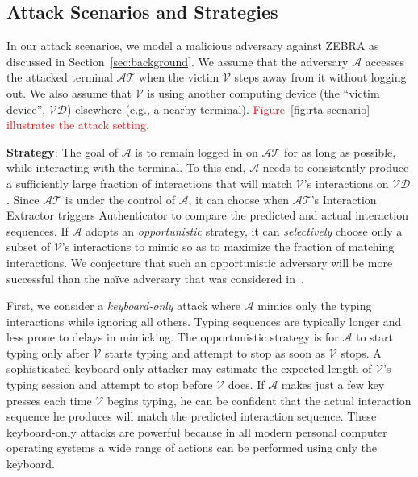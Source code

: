 \documentclass[conference]{IEEEtran}
\newcommand{\zebra}{ZEBRA\xspace}
\newcommand{\KBactivity}{keyboard-only\xspace}
\newcommand{\attacker}{$\mathcal{A}$\xspace}
\newcommand{\victim}{$\mathcal{V}$\xspace}
\newcommand{\attackedterminal}{$\mathcal{AT}$\xspace}
\newcommand{\victimdevice}{$\mathcal{VD}$\xspace}
\newcommand\changeAsokan[1]{\textcolor{red}{#1}}
\newcommand\changeAsokan[1]{{#1}}
\begin{document}
 
\subsection{Attack Scenarios and Strategies}
\label{subsec:scenarios}






In our attack scenarios, we model a malicious adversary against \zebra
as discussed in Section~\ref{sec:background}.  We assume that the
adversary \attacker accesses the attacked terminal \attackedterminal when the victim \victim steps away from
it without logging out. We also assume that \victim is using
another computing device (the ``victim device'', \victimdevice) elsewhere (e.g., a nearby terminal). \changeAsokan{Figure~\ref{fig:rta-scenario} illustrates the attack setting.}


\vspace{1mm}
\noindent\textbf{Strategy}: The goal of \attacker is to remain logged in on \attackedterminal for as long as possible, while interacting with the terminal. To this end, \attacker needs to consistently produce a sufficiently large fraction of interactions that will match \victim's interactions on \victimdevice. Since \attackedterminal is under the control of \attacker, it can choose when \attackedterminal's Interaction Extractor triggers Authenticator to compare the predicted and actual interaction sequences. If \attacker adopts an \textit{opportunistic} strategy, it can \textit{selectively} choose only a subset of \victim's interactions to mimic so as to maximize the fraction of matching interactions.
We conjecture that such an opportunistic adversary will be more
successful than the na\"{i}ve adversary that was considered
in~\cite{mare2014zebra}.

First, we consider a
\textit{\KBactivity} attack where \attacker mimics only the typing
interactions while ignoring all others. Typing sequences are typically longer and less prone to delays in mimicking.
The opportunistic strategy is for \attacker to start typing only after \victim starts
typing and attempt to stop as soon as 
\victim stops. A sophisticated \KBactivity attacker may estimate
the expected length of \victim's typing session and
attempt to stop before \victim does. If \attacker makes just a few key presses each time \victim begins typing, he can be confident that the actual interaction sequence he produces will match the predicted interaction sequence. These \KBactivity attacks are powerful because in all modern personal computer operating systems a wide range of actions can be performed using only the keyboard.
\end{document}
